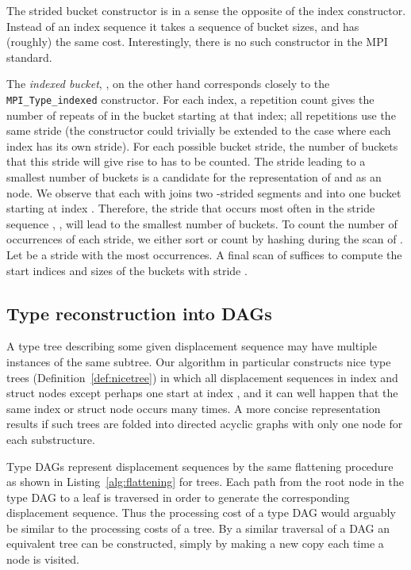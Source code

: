 \documentclass[a4paper,11pt]{article}
\begin{document}
The strided bucket constructor is in a sense the opposite of the index
constructor. Instead of an index sequence it takes a sequence of
bucket sizes, and has (roughly) the same cost. Interestingly, there is
no such constructor in the MPI standard.

The \emph{indexed bucket}, , on the other hand corresponds closely to
the \texttt{MPI\_\-Type\_\-indexed} constructor. For each index, a
repetition count  gives the number of repeats of  in the
bucket starting at that index; all repetitions use the same stride 
(the constructor could trivially be extended to the case where each
index has its own stride). For each possible bucket stride, the number
of buckets that this stride will give rise to has to be counted. The
stride  leading to a smallest number of buckets is a candidate for
the representation of  and  as an  node. We observe
that each  with  joins two -strided segments
 and  into one bucket starting at index
. Therefore, the stride that occurs most often in the stride
sequence , , will lead to the
smallest number of buckets. To count the number of occurrences of each
stride, we either sort  or count by hashing during the scan of
. Let  be a stride with the most occurrences. A final scan of
 suffices to compute the start indices and sizes of the buckets
with stride .

\subsection{Type reconstruction into DAGs}
\label{sec:dagreconstruc}

A type tree describing some given displacement sequence may have
multiple instances of the same subtree. Our algorithm in particular
constructs nice type trees (Definition~\ref{def:nicetree}) in which
all displacement sequences in index and struct nodes except perhaps
one start at index , and it can well happen that the same index or
struct node occurs many times. A more concise representation results
if such trees are folded into directed acyclic graphs with only one
node for each substructure.

Type DAGs represent displacement sequences by the same flattening
procedure as shown in Listing~\ref{alg:flattening} for trees. Each
path from the root node in the type DAG to a leaf is traversed in
order to generate the corresponding displacement sequence. Thus the
processing cost of a type DAG would arguably be similar to the
processing costs of a tree. By a similar traversal of a DAG an
equivalent tree can be constructed, simply by making a new copy each
time a node is visited.
\end{document}
